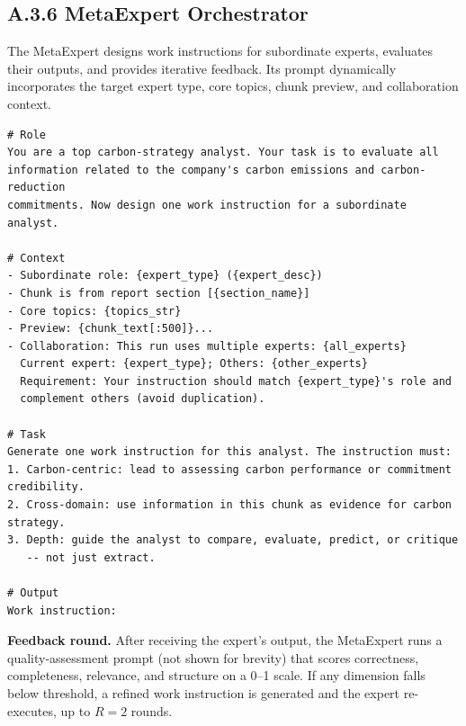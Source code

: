 \subsection*{A.3.6 MetaExpert Orchestrator}
The MetaExpert designs work instructions for subordinate experts, evaluates their outputs, and provides iterative feedback. Its prompt dynamically incorporates the target expert type, core topics, chunk preview, and collaboration context.

\begin{lstlisting}
# Role
You are a top carbon-strategy analyst. Your task is to evaluate all
information related to the company's carbon emissions and carbon-reduction
commitments. Now design one work instruction for a subordinate analyst.

# Context
- Subordinate role: {expert_type} ({expert_desc})
- Chunk is from report section [{section_name}]
- Core topics: {topics_str}
- Preview: {chunk_text[:500]}...
- Collaboration: This run uses multiple experts: {all_experts}
  Current expert: {expert_type}; Others: {other_experts}
  Requirement: Your instruction should match {expert_type}'s role and
  complement others (avoid duplication).

# Task
Generate one work instruction for this analyst. The instruction must:
1. Carbon-centric: lead to assessing carbon performance or commitment credibility.
2. Cross-domain: use information in this chunk as evidence for carbon strategy.
3. Depth: guide the analyst to compare, evaluate, predict, or critique
   -- not just extract.

# Output
Work instruction:
\end{lstlisting}

\noindent\textbf{Feedback round.} After receiving the expert's output, the MetaExpert runs a quality-assessment prompt (not shown for brevity) that scores correctness, completeness, relevance, and structure on a 0--1 scale. If any dimension falls below threshold, a refined work instruction is generated and the expert re-executes, up to $R=2$ rounds.

